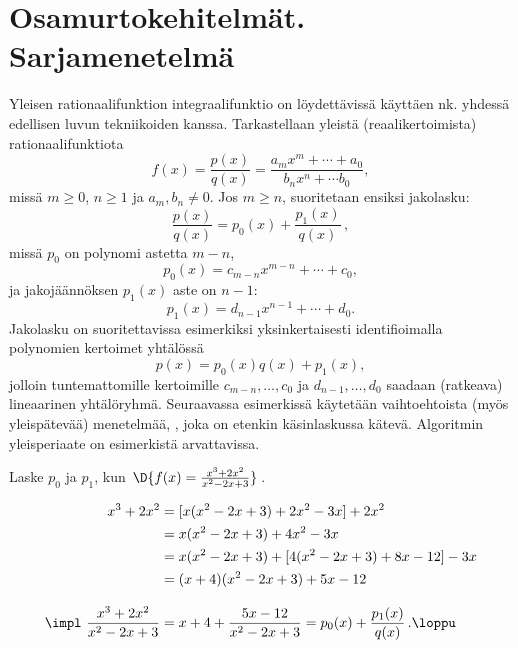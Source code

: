 \section{Osamurtokehitelmät. Sarjamenetelmä} \label{osamurtokehitelmät}
\alku
{}

Yleisen rationaalifunktion integraalifunktio on löydettävissä käyttäen nk. 
 yhdessä edellisen luvun tekniikoiden kanssa. Tarkastellaan yleistä
(reaalikertoimista) rationaalifunktiota
\[
f(x)=\frac{p(x)}{q(x)}=\frac{a_mx^m+\cdots +a_0}{b_nx^n+\cdots b_0},
\]
missä $m\geq 0$, $n\geq 1$ ja $a_m,b_n\neq 0$. Jos $m\geq n$, suoritetaan ensiksi jakolasku:
\[
\frac{p(x)}{q(x)}=p_0(x)+\frac{p_1(x)}{q(x)}\,,
\]
missä $p_0$ on polynomi astetta $m-n$,
\[
p_0(x)=c_{m-n}x^{m-n}+\cdots +c_0,
\]
ja jakojäännöksen $p_1(x)$ aste on $n-1$:
\[
p_1(x)=d_{n-1}x^{n-1}+\cdots +d_0.
\]
Jakolasku on suoritettavissa esimerkiksi yksinkertaisesti identifioimalla polynomien kertoimet
yhtälössä
\[
p(x)=p_0(x)q(x)+p_1(x),
\]
jolloin tuntemattomille kertoimille $c_{m-n},\ldots,c_0$ ja $d_{n-1},\ldots,d_0$ saadaan
(ratkeava) lineaarinen yhtälöryhmä. Seuraavassa esimerkissä käytetään vaihtoehtoista
(myös yleispätevää) menetelmää, , joka on etenkin käsinlaskussa
kätevä. Algoritmin yleisperiaate on esimerkistä arvattavissa.
\begin{Exa} Laske $p_0$ ja $p_1$, kun $\,\D{f(x)=\frac{x^3+2x^2}{x^2-2x+3}}\,$.
\end{Exa}
\ratk
\begin{align*}
x^3+2x^2                          &= [x(x^2-2x+3)+2x^2-3x]+2x^2 \\
                                  &= x(x^2-2x+3)+4x^2-3x \\
                                  &= x(x^2-2x+3)+[4(x^2-2x+3)+8x-12]-3x \\
                                  &= (x+4)(x^2-2x+3)+5x-12 \\[3mm]
\impl \ \frac{x^3+2x^2}{x^2-2x+3} &= x+4+\frac{5x-12}{x^2-2x+3}
                                   =p_0(x)+\frac{p_1(x)}{q(x)}\,. \loppu
\end{align*}

